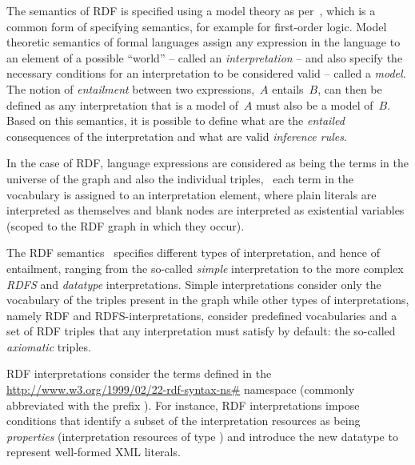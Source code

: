 The semantics of \ac{RDF} is specified using a model theory as per~\citet{Hayes:2004aa}, which is a common form of specifying
semantics, for example for first-order logic.
%
Model theoretic semantics of formal languages assign any expression in the language to an element of a possible
``world'' -- called an \emph{interpretation} -- and also specify the necessary conditions for an interpretation to be
considered valid -- called a \emph{model}.  The notion of \emph{entailment} between two expressions,~$A$ entails~$B$,
can then be defined as any interpretation that is a model of~$A$ must also be a model of~$B$.
%
Based on this semantics, it is possible to define what are the \emph{entailed} consequences of the interpretation and
what are valid \emph{inference rules}. 


In the case of \ac{RDF}, language expressions are considered as being the terms in the universe of the graph and also the
individual triples, \ie~each term in the vocabulary is assigned to an interpretation element, where plain literals are
interpreted as themselves and blank nodes are interpreted as existential variables (scoped to the \ac{RDF} graph in which
they occur).


The \ac{RDF} semantics~\cite{Hayes:2004aa} specifies different types of interpretation, and hence of entailment, ranging
from the so-called \emph{simple} interpretation to the more complex \emph{RDFS} and \emph{datatype} interpretations.
%
Simple interpretations consider only the vocabulary of the triples present in the graph while other types of
interpretations, namely \ac{RDF} and \ac{RDFS}-interpretations, consider predefined vocabularies and a set of \ac{RDF}
triples that any interpretation must satisfy by default: the so-called \emph{axiomatic} triples.


\ac{RDF} interpretations consider the terms defined in the \url{http://www.w3.org/1999/02/22-rdf-syntax-ns#} namespace
(commonly abbreviated with the prefix ).
%
For instance, \ac{RDF} interpretations impose conditions that identify a subset of the interpretation resources as being
\emph{properties} (interpretation resources of type ) and introduce the new datatype
 to represent well-formed \ac{XML} literals. %



